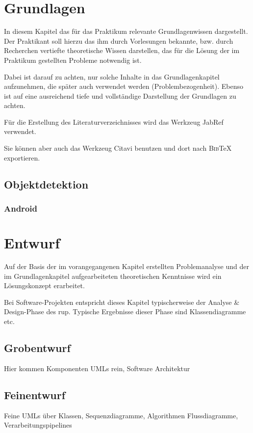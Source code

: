 \documentclass[oneside]{ausarbeitung}
\begin{document}
\chapter{Grundlagen}
\label{cha:grundlagen}

In diesem Kapitel das für das Praktikum relevante Grundlagenwissen 
dargestellt. Der Praktikant soll hierzu das ihm durch Vorlesungen 
bekannte, bzw. durch Recherchen vertiefte theoretische Wissen 
darstellen, das für die Lösung der im Praktikum gestellten Probleme 
notwendig ist.

Dabei ist darauf zu achten, nur solche Inhalte in das Grundlagenkapitel 
aufzunehmen, die später auch verwendet werden (Problembezogenheit). 
Ebenso ist auf eine ausreichend tiefe und vollständige Darstellung der 
Grundlagen zu achten.

Für die Erstellung des Literaturverzeichnisses 
wird das Werkzeug JabRef\autocite{JabRef:JabRef} verwendet. 

Sie können aber auch das Werkzeug Citavi\autocite{SAS:Citavi} benutzen
und dort nach \textsc{Bib}\TeX{} exportieren.
\section{Objektdetektion}
\label{sec:basics:objektdetektion}

\subsection{Android}
\label{sub:basics:android}

\chapter{Entwurf}
\label{cha:Entwurf}
Auf der Basis der im vorangegangenen Kapitel erstellten Problemanalyse 
und der im Grundlagenkapitel aufgearbeiteten theoretischen Kenntnisse 
wird ein Lösungskonzept erarbeitet.

Bei Software-Projekten entspricht dieses Kapitel typischerweise der 
Analyse \& Design-Phase des \ac{rup}. Typische Ergebnisse dieser Phase sind 
Klassendiagramme etc.
\section{Grobentwurf}
Hier kommen Komponenten UMLs rein, Software Architektur
\section{Feinentwurf}
Feine UMLs über Klassen, Sequenzdiagramme, Algorithmen Flussdiagramme, Verarbeitungspipelines
\end{document}
